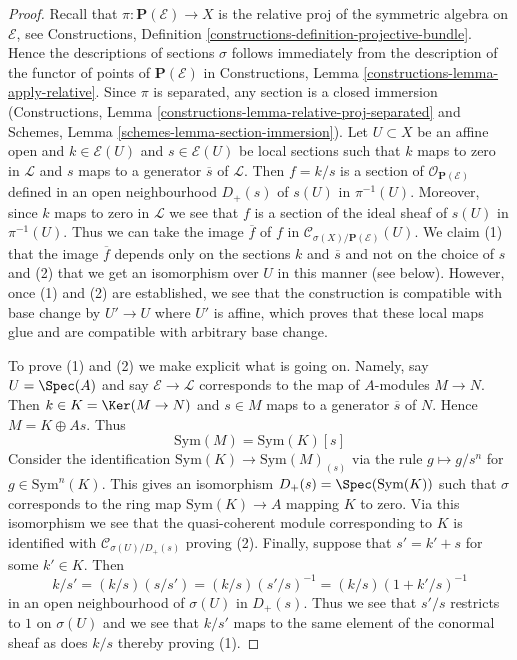 \begin{proof}
Recall that $\pi : \mathbf{P}(\mathcal{E}) \to X$ is the relative proj of the
symmetric algebra on $\mathcal{E}$, see
Constructions, Definition \ref{constructions-definition-projective-bundle}.
Hence the descriptions of sections $\sigma$ follows immediately from
the description of the functor of points of $\mathbf{P}(\mathcal{E})$
in Constructions, Lemma \ref{constructions-lemma-apply-relative}.
Since $\pi$ is separated, any section is a closed immersion
(Constructions, Lemma \ref{constructions-lemma-relative-proj-separated} and
Schemes, Lemma \ref{schemes-lemma-section-immersion}).
Let $U \subset X$ be an affine open and $k \in \mathcal{E}(U)$ and
$s \in \mathcal{E}(U)$ be local sections such that $k$ maps to
zero in $\mathcal{L}$ and $s$ maps to a generator $\overline{s}$
of $\mathcal{L}$.
Then $f = k/s$ is a section of $\mathcal{O}_{\mathbf{P}(\mathcal{E})}$
defined in an open neighbourhood $D_+(s)$ of $s(U)$ in $\pi^{-1}(U)$.
Moreover, since $k$ maps to zero in $\mathcal{L}$ we see that
$f$ is a section of the ideal sheaf of $s(U)$ in $\pi^{-1}(U)$.
Thus we can take the image $\overline{f}$ of $f$ in
$\mathcal{C}_{\sigma(X)/\mathbf{P}(\mathcal{E})}(U)$.
We claim (1) that the image $\overline{f}$ depends only on the
sections $k$ and $\overline{s}$ and not on the choice of $s$
and (2) that we get an isomorphism over $U$ in this manner (see below).
However, once (1) and (2) are established, we see that
the construction is compatible with base change by $U' \to U$
where $U'$ is affine, which proves that these local maps glue
and are compatible with arbitrary base change.

\medskip\noindent
To prove (1) and (2) we make explicit what is going on.
Namely, say $U = \Spec(A)$ and say $\mathcal{E} \to \mathcal{L}$
corresponds to the map of $A$-modules $M \to N$. Then
$k \in K = \Ker(M \to N)$ and $s \in M$ maps to a generator $\overline{s}$
of $N$. Hence $M = K \oplus A s$. Thus
$$
\text{Sym}(M) = \text{Sym}(K)[s]
$$
Consider the identification $\text{Sym}(K) \to \text{Sym}(M)_{(s)}$
via the rule $g \mapsto g/s^n$ for $g \in \text{Sym}^n(K)$.
This gives an isomorphism $D_+(s) = \Spec(\text{Sym}(K))$ such
that $\sigma$ corresponds to the ring map $\text{Sym}(K) \to A$
mapping $K$ to zero. Via this isomorphism we see that the quasi-coherent
module corresponding to $K$ is identified with
$\mathcal{C}_{\sigma(U)/D_+(s)}$ proving (2).
Finally, suppose that $s' = k' + s$ for some $k' \in K$.
Then
$$
k/s' = (k/s) (s/s') = (k/s) (s'/s)^{-1} = (k/s) (1 + k'/s)^{-1}
$$
in an open neighbourhood of $\sigma(U)$ in $D_+(s)$. Thus we see that
$s'/s$ restricts to $1$ on $\sigma(U)$ and we see that $k/s'$ maps to
the same element of the conormal sheaf as does $k/s$ thereby proving (1).
\end{proof}





